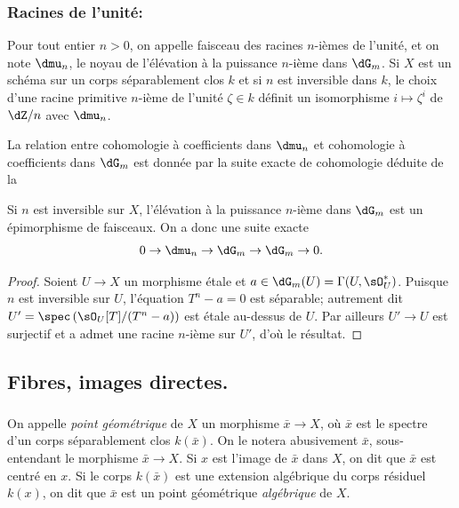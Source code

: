 \subsubsection{Racines de l'unité:}\label{I:2-2-4}

Pour tout entier $n>0$, on appelle faisceau des racines $n$-ièmes de 
l'unité, et on note $\dmu_n$, le noyau de l'élévation à la puissance 
$n$-ième dans $\dG_m$. Si $X$ est un schéma sur un corps séparablement 
clos $k$ et si $n$ est inversible dans $k$, le choix d'une racine primitive 
$n$-ième de l'unité $\zeta\in k$ définit un isomorphisme 
$i\mapsto \zeta^i$ de $\dZ/n$ avec $\dmu_n$. 

La relation entre cohomologie à coefficients dans $\dmu_n$ et cohomologie à 
coefficients dans $\dG_m$ est donnée par la suite exacte de cohomologie déduite 
de la 






\begin{sourcenameddash}\label{I:2-2-5}
Si $n$ est inversible sur $X$, l'élévation à la puissance $n$-ième dans 
$\dG_m$ est un épimorphisme de faisceaux. On a donc une suite exacte 
\[
  0 \to \dmu_n \to \dG_m \to \dG_m \to 0\text{.}
\]
\end{sourcenameddash}
\begin{proof}
Soient $U\to X$ un morphisme étale et $a\in \dG_m(U) =\Gamma(U,\sO_U^*)$. 
Puisque $n$ est inversible sur $U$, l'équation $T^n-a = 0$ est séparable; 
autrement dit $U'=\spec\left(\sO_U[T]/(T^n-a)\right)$ est étale au-dessus de 
$U$. Par ailleurs $U'\to U$ est surjectif et a admet une racine $n$-ième sur 
$U'$, d'où le résultat. 
\end{proof}










\subsection{Fibres, images directes.}\label{I:2-3}





\subsubsection{}\label{I:2-3-1}

On appelle \emph{point géométrique} de $X$ un morphisme $\bar x\to X$, où 
$\bar x$ est le spectre d'un corps séparablement clos $k(\bar x)$. On le notera 
abusivement $\bar x$, sous-entendant le morphisme $\bar x\to X$. Si $x$ est 
l'image de $\bar x$ dans $X$, on dit que $\bar x$ est centré en $x$. Si le 
corps $k(\bar x)$ est une extension algébrique du corps résiduel $k(x)$, on dit 
que $\bar x$ est un point géométrique \emph{algébrique} de $X$. 

